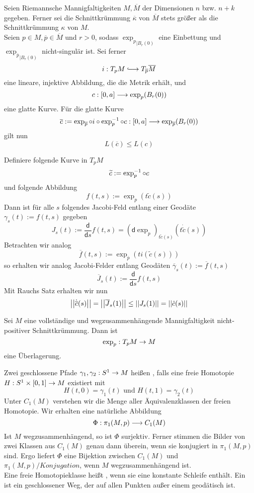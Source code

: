\documentclass{book}
\renewcommand{\d}{\textsf{d}}
\renewcommand{\l}[1]{\overline{#1}}
\begin{document}
\Kor{}
Seien Riemannsche Mannigfaltigkeiten $M, \l M$ der Dimensionen $n$ bzw. $n + k$ gegeben. Ferner sei die Schnittkrümmung $\l \kappa$ von $\l M$ stets größer als die Schnittkrümmung $\kappa$ von $M$.\\
Seien $p\in M, \l p \in \l M$ und $r > 0$, sodass ${\exp_p}_{| B_r(0)}$ eine Einbettung und ${\exp_{\l p}}_{|B_r(0)}$ nicht-singulär ist. Sei ferner
\[ i : T_pM \Inj{} T_{\l p}\l M\]
eine lineare, injektive Abbildung, die die Metrik erhält, und
\[c : [0,a] \overset{}{\longrightarrow} \exp_p(B_r(0))\]
eine glatte Kurve. Für die glatte Kurve
\[ \l c := \exp_{\l p} \circ i\circ  \exp_p\i \circ c : [0,a]  \Pfeil{} \exp_{\l p}(B_r(0)) \]
gilt nun
\[ L(\l c) \leq L(c) \]
\begin{Beweis}{}
Definiere folgende Kurve in $T_pM$
\[ \widetilde{c} := \exp_p^{-1} \circ c \]
und folgende Abbildung
\[ f(t,s) := \exp_{p}(t\widetilde{c}(s)) \]
Dann ist für alle $s$ folgendes Jacobi-Feld entlang einer Geodäte $\gamma_s(t) := f(t,s)$ gegeben
\[ J_s(t) := \frac{\d}{\d s} f(t,s) = (\d \exp_p)_{t\widetilde{c}(s)}(t\dot{\widetilde{c}}(s)) \]
Betrachten wir analog
\[ \l f(t,s) := \exp_{\l p}(t i(\widetilde{c}(s))) \]
so erhalten wir analog Jacobi-Felder entlang Geodäten $\l\gamma_s(t) := \l f(t,s)$
\[ \l J_s(t) := \frac{\d}{\d s}f(t,s)\]
Mit Rauchs Satz erhalten wir nun
\[ \norm{\dot{\l c}(s)} = \norm{\l J_s(1)} \leq \norm{J_s(1)} = \norm{\dot{c}(s)} \]
\end{Beweis}

Sei $M$ eine vollständige und wegzusammenhängende Mannigfaltigkeit nicht-positiver Schnittkrümmung. Dann ist
\[ \exp_p :T_pM \overset{}{\rightarrow} M \]
eine Überlagerung.

\Def{}
Zwei geschlossene Pfade $\gamma_1, \gamma_2 : S^1 \overset{}{\rightarrow} M$ heißen , falls eine freie Homotopie $H : S^1 \times [0,1] \overset{}{\rightarrow} M$ existiert mit
\[ H(t,0) = \gamma_1(t) \text{ und } H(t,1) = \gamma_2(t) \]
Unter $C_1(M)$ verstehen wir die Menge aller Äquivalenzklassen der freien Homotopie. Wir erhalten eine natürliche Abbildung
\[ \Phi : \pi_1(M,p) \overset{}{\longrightarrow} C_1(M) \]
Ist $M$ wegzusammenhängend, so ist $\Phi$ surjektiv. Ferner stimmen die Bilder von zwei Klassen aus $C_1(M)$ genau dann überein, wenn sie konjugiert in $\pi_1(M,p)$ sind. Ergo liefert $\Phi$ eine Bijektion zwischen $C_1(M)$ und $\pi_1(M,p)/Konjugation$, wenn $M$ wegzusammenhängend ist.\\
Eine freie Homotopieklasse heißt , wenn sie eine konstante Schleife enthält. Ein  ist ein geschlossener Weg, der auf allen Punkten außer einem geodätisch ist.
\end{document}
